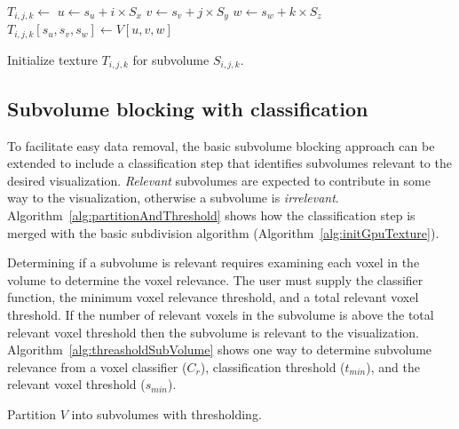 \documentclass[journal]{vgtc}                %
\begin{document}
\begin{algorithm}[]  
	\begin{algorithmic}[1]
		\State $T_{i,j,k} \gets $  
		 
		\State $u \gets s_u + i \times S_x$ 
		\State $v \gets s_v + j \times S_y$ 
		\State $w \gets s_w + k \times S_z$ 
		\State $T_{i,j,k}\left[s_u, s_v, s_w \right] \gets V\left[u,v,w\right]$ 
		\EndFor
		\EndFor
		\EndFor
		\EndProcedure
	\end{algorithmic}
	\caption{Initialize texture $T_{i,j,k}$ for subvolume $S_{i,j,k}$.}
	\label{alg:initGpuTexture}
\end{algorithm}


\subsection{Subvolume blocking with classification}\label{sec:subvolumeBlockingWithClassification}

To facilitate easy data removal, the basic subvolume blocking approach can be extended to 
include a classification step that identifies subvolumes relevant to the desired visualization. 
\textit{Relevant} subvolumes are expected to contribute in some way to the visualization, otherwise 
a subvolume is \textit{irrelevant}. Algorithm~\ref{alg:partitionAndThreshold} shows how the classification 
step is merged  with the basic subdivision algorithm (Algorithm~\ref{alg:initGpuTexture}).

Determining if a subvolume is relevant requires examining each voxel in the
volume to determine the voxel relevance. The user must supply the classifier
function, the minimum voxel relevance threshold, and a total relevant voxel
threshold. If the number of relevant voxels in the subvolume is above the total
relevant voxel threshold then the subvolume is relevant to the visualization.
Algorithm~\ref{alg:threasholdSubVolume} shows one way to determine subvolume
relevance from a voxel classifier ($C_{r}$), classification threshold ($t_{min}$),
and the relevant voxel threshold ($s_{min}$).

\begin{algorithm}[]
	\begin{algorithmic}[1]  
		   
		\State {} 
		\EndIf
		\EndFor
		\EndFor
		\EndFor
		\EndProcedure
	\end{algorithmic}
	\caption{Partition $V$ into subvolumes with thresholding.}
	\label{alg:partitionAndThreshold}
\end{algorithm}
\end{document}
